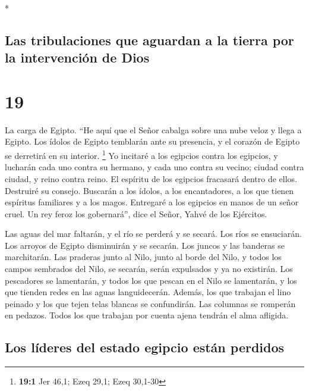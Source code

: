 \begin{paracol}{2}
\begin{otherlanguage}{english}
\end{otherlanguage}

\switchcolumn[0]*

\hypertarget{las-tribulaciones-que-aguardan-a-la-tierra-por-la-intervenciuxf3n-de-dios}{%
\subsection{Las tribulaciones que aguardan a la tierra por la
intervención de
Dios}\label{las-tribulaciones-que-aguardan-a-la-tierra-por-la-intervenciuxf3n-de-dios}}

\hypertarget{section-36}{%
\section{19}\label{section-36}}

 La carga de Egipto. ``He aquí que el Señor cabalga sobre
una nube veloz y llega a Egipto. Los ídolos de Egipto temblarán ante su
presencia, y el corazón de Egipto se derretirá en su interior.
\footnote{\textbf{19:1} Jer 46,1; Ezeq 29,1; Ezeq 30,1-30}
 Yo incitaré a los egipcios contra los egipcios, y
lucharán cada uno contra su hermano, y cada uno contra su vecino; ciudad
contra ciudad, y reino contra reino.  El espíritu de los
egipcios fracasará dentro de ellos. Destruiré su consejo. Buscarán a los
ídolos, a los encantadores, a los que tienen espíritus familiares y a
los magos.  Entregaré a los egipcios en manos de un señor
cruel. Un rey feroz los gobernará'', dice el Señor, Yahvé de los
Ejércitos.

 Las aguas del mar faltarán, y el río se perderá y se
secará.  Los ríos se ensuciarán. Los arroyos de Egipto
disminuirán y se secarán. Los juncos y las banderas se marchitarán.
 Las praderas junto al Nilo, junto al borde del Nilo, y
todos los campos sembrados del Nilo, se secarán, serán expulsados y ya
no existirán.  Los pescadores se lamentarán, y todos los
que pescan en el Nilo se lamentarán, y los que tienden redes en las
aguas languidecerán.  Además, los que trabajan el lino
peinado y los que tejen telas blancas se confundirán. 
Las columnas se romperán en pedazos. Todos los que trabajan por cuenta
ajena tendrán el alma afligida.

\hypertarget{los-luxedderes-del-estado-egipcio-estuxe1n-perdidos}{%
\subsection{Los líderes del estado egipcio están
perdidos}\label{los-luxedderes-del-estado-egipcio-estuxe1n-perdidos}}


\end{paracol}
